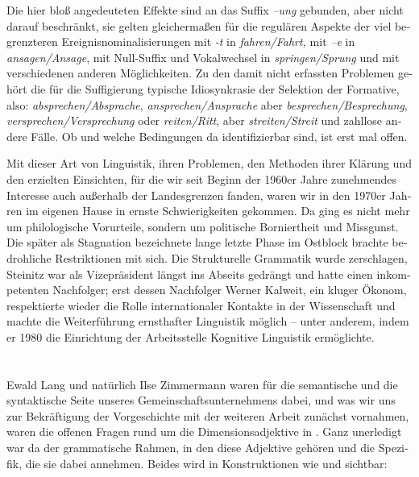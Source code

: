 \documentclass[output=paper,colorlinks,citecolor=brown]{langscibook}
\begin{document}
\begin{otherlanguage}{german}
\noindent Die hier bloß angedeuteten Effekte sind an das Suffix \textit{–ung} gebunden, aber nicht darauf beschränkt, sie gelten gleichermaßen für die regulären Aspekte der viel begrenzteren Ereignisnominalisierungen mit \textit{-t} in \textit{fahren/Fahrt,} mit \textit{–e} in \textit{ansagen/Ansage}, mit Null-Suffix und Vokalwechsel in \textit{springen/Sprung} und mit verschiedenen anderen Möglichkeiten. Zu den damit nicht erfassten Problemen gehört die für die Suffigierung typische Idiosynkrasie der Selektion der Formative, also: \textit{absprechen/Absprache}, \textit{ansprechen/Ansprache} aber \textit{besprechen/Besprechung}, \textit{versprechen/Versprechung} oder \textit{reiten/Ritt}, aber \textit{streiten/Streit} und zahllose andere Fälle. Ob und welche Bedingungen da identifizierbar sind, ist erst mal offen.

Mit dieser Art von Linguistik, ihren Problemen, den Methoden ihrer Klärung und den erzielten Einsichten, für die wir seit Beginn der 1960er Jahre zunehmendes Interesse auch außerhalb der Landesgrenzen fanden, waren wir in den 1970er Jahren im eigenen Hause in ernste Schwierigkeiten gekommen. Da ging es nicht mehr um philologische Vorurteile, sondern um politische Borniertheit und Missgunst. Die später als Stagnation bezeichnete lange letzte Phase im Ostblock brachte bedrohliche Restriktionen mit sich. Die \glqq Strukturelle Grammatik\grqq{} wurde zerschlagen, Steinitz war als Vizepräsident längst ins Abseits gedrängt und hatte einen inkompetenten Nachfolger; erst dessen Nachfolger Werner Kalweit, ein kluger Ökonom, respektierte wieder die Rolle internationaler Kontakte in der Wissenschaft und machte die Weiterführung ernsthafter Linguistik möglich -- unter anderem, indem er 1980 die Einrichtung der \glqq Arbeitsstelle Kognitive Linguistik\grqq{} ermöglichte.

\section{}\label{sec:4}

Ewald Lang und natürlich Ilse Zimmermann waren für die semantische und die syntaktische Seite unseres Gemeinschaftsunternehmens \citep{BierwischLang1987} dabei, und was wir uns zur Bekräftigung der Vorgeschichte mit der weiteren Arbeit zunächst vornahmen, waren die offenen Fragen rund um die Dimensionsadjektive in . Ganz unerledigt war da der grammatische Rahmen, in den diese Adjektive gehören und die Spezifik, die sie dabei annehmen. Beides wird in Konstruktionen wie  und  sichtbar:


\end{otherlanguage}
\end{document}
